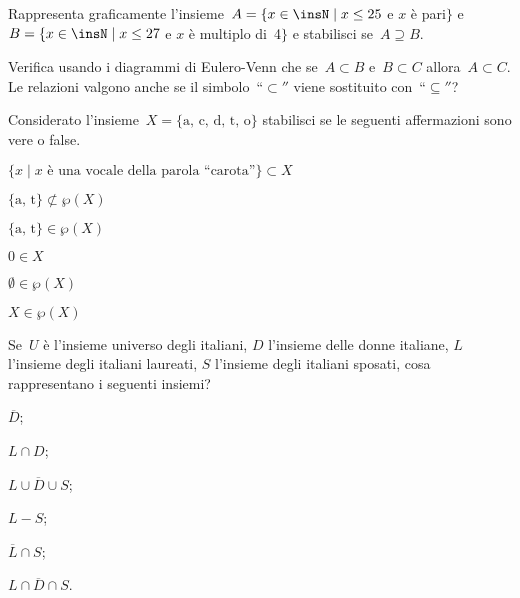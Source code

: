 \begin{esercizio}
\label{ese:5.116}
Rappresenta graficamente l'insieme~$A=\{x\in\insN\mid x\le 25$ e $x$ è pari$\}$ e
$B=\{x\in\insN\mid x\le 27$ e $x$ è multiplo di~4$\}$ e stabilisci se~$A\supseteq B$.
\end{esercizio}

\begin{esercizio}
\label{ese:5.117}
Verifica usando i diagrammi di Eulero-Venn che se~$A\subset B$ e~$B\subset C$ allora~$A\subset C$. Le relazioni valgono
anche se il simbolo~``${\subset}''$ viene sostituito con~``${\subseteq}''$?
\end{esercizio}

\begin{esercizio}
\label{ese:5.118}
Considerato l'insieme~$X=\{\text{a, c, d, t, o}\}$ stabilisci se le seguenti affermazioni sono vere o false.

\TabPositions{8cm}
\begin{enumeratea}
\item $\{x\mid x\text{ è una vocale della parola ``carota''}\} \subset X$ \tab\boxV\quad\boxF
\item $\{\text{a, t}\}\not\subset \wp (X)$ \tab\boxV\quad\boxF
\item $\{\text{a, t}\}\in \wp (X)$ \tab\boxV\quad\boxF
\item $0\in X$ \tab\boxV\quad\boxF
\item $\emptyset \in \wp (X)$ \tab\boxV\quad\boxF
\item $X\in \wp (X)$ \tab\boxV\quad\boxF
\end{enumeratea}
\end{esercizio}

\begin{esercizio}
\label{ese:5.119}
Se~$U$ è l'insieme universo degli italiani, $D$ l'insieme delle donne italiane,
$L$ l'insieme degli italiani laureati, $S$ l'insieme degli italiani sposati, cosa rappresentano
i seguenti insiemi?
\begin{multicols}{3}
\begin{enumeratea}
\item $\overline{D}$;
\item $L\cap D$;
\item $\overline{{L\cup D\cup S}}$;
\item $L-S$;
\item $\overline{{L}}\cap S$;
\item $\overline{{L\cap D\cap S}}$.
\end{enumeratea}
\end{multicols}
\end{esercizio}

